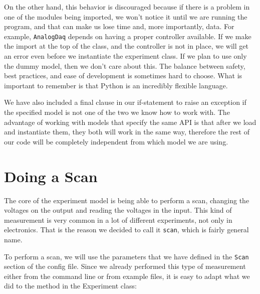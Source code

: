 On the other hand, this behavior is discouraged because if there is a problem in one of the modules being imported, we won't notice it until we are running the program, and that can make us lose time and, more importantly, data. For example, \texttt{AnalogDaq} depends on having a proper controller available. If we make the import at the top of the class, and the controller is not in place, we will get an error even before we instantiate the experiment class. If we plan to use only the dummy model, then we don't care about this. The balance between safety, best practices, and ease of development is sometimes hard to choose. What is important to remember is that Python is an incredibly flexible language.

We have also included a final clause in our if-statement to raise an exception if the specified model is not one of the two we know how to work with. The advantage of working with models that specify the same API is that after we load and instantiate them, they both will work in the same way, therefore the rest of our code will be completely independent from which model we are using.


\section{Doing a Scan}\label{section:doing-scan}
The core of the experiment model is being able to perform a scan, changing the voltages on the output and reading the voltages in the input. This kind of measurement is very common in a lot of different experiments, not only in electronics. That is the reason we decided to call it \texttt{scan}, which is fairly general name.


To perform a scan, we will use the parameters that we have defined in the \texttt{Scan} section of the config file. Since we already performed this type of measurement either from the command line or from example files, it is easy to adapt what we did to the method in the Experiment class:

